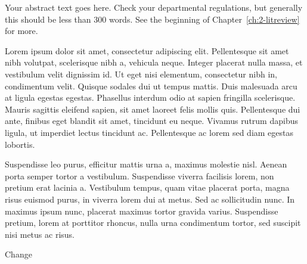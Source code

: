 Your abstract text goes here.  Check your departmental regulations, but generally this should be less than 300 words.  See the beginning of Chapter~\ref{ch:2-litreview} for more.

Lorem ipsum dolor sit amet, consectetur adipiscing elit. Pellentesque sit amet nibh volutpat, scelerisque nibh a, vehicula neque. Integer placerat nulla massa, et vestibulum velit dignissim id. Ut eget nisi elementum, consectetur nibh in, condimentum velit. Quisque sodales dui ut tempus mattis. Duis malesuada arcu at ligula egestas egestas. Phasellus interdum odio at sapien fringilla scelerisque. Mauris sagittis eleifend sapien, sit amet laoreet felis mollis quis. Pellentesque dui ante, finibus eget blandit sit amet, tincidunt eu neque. Vivamus rutrum dapibus ligula, ut imperdiet lectus tincidunt ac. Pellentesque ac lorem sed diam egestas lobortis.

Suspendisse leo purus, efficitur mattis urna a, maximus molestie nisl. Aenean porta semper tortor a vestibulum. Suspendisse viverra facilisis lorem, non pretium erat lacinia a. Vestibulum tempus, quam vitae placerat porta, magna risus euismod purus, in viverra lorem dui at metus. Sed ac sollicitudin nunc. In maximus ipsum nunc, placerat maximus tortor gravida varius. Suspendisse pretium, lorem at porttitor rhoncus, nulla urna condimentum tortor, sed suscipit nisi metus ac risus.

Change